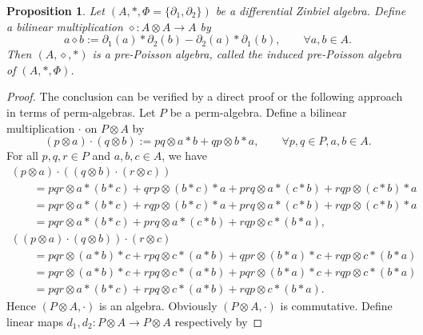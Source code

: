 \documentclass[10pt,a4paper]{amsart}
\numberwithin{equation}{section}
\newtheorem{Proposition}[Theorem]{Proposition}
{ \theoremstyle{definition}
	\newtheorem{Definition}[Theorem]{Definition}
	\newtheorem{Note}[Theorem]{Note}
	\newtheorem{Example}[Theorem]{Example}
	\newtheorem{Remark}[Theorem]{Remark} }
\begin{document}
\begin{Proposition}\label{pro:dzpp} Let $(A, \ast, \Phi = \{\partial_1, \partial_2\})$ be a differential Zinbiel algebra.
 Define a bilinear multiplication $\diamond\colon A \otimes A \to A$ by
 \begin{equation}
 a \diamond b := \partial_1(a) \ast \partial_2 (b) - \partial_2(a) \ast \partial_1(b), \qquad \forall a, b \in A. \label{eq:dzpp}
 \end{equation}
 Then $(A, \diamond, \ast)$ is a pre-Poisson algebra, called the \textit{induced pre-Poisson algebra of $(A, \ast, \Phi)$}.
\end{Proposition}
\begin{proof}The conclusion can be verified by a direct proof or the following approach in terms of perm-algebras. Let $P$ be a perm-algebra. Define a bilinear multiplication $\cdot$ on $P \otimes A$ by
 \begin{equation*}
 (p \otimes a) \cdot (q \otimes b) := pq \otimes a*b + qp \otimes b*a, \qquad \forall p, q \in P, a, b \in A.
 \end{equation*}
 For all $p, q, r \in P$ and $a, b, c \in A$, we have
 \begin{gather*}
 (p \otimes a) \cdot ((q \otimes b) \cdot (r \otimes c)) \\
 \qquad{}= pqr \otimes a \ast (b \ast c) + qrp \otimes (b \ast c) \ast a + prq \otimes a \ast (c \ast b) + rqp \otimes (c \ast b) \ast a \\
 \qquad{}=pqr \otimes a \ast (b \ast c) + rqp \otimes (b \ast c) \ast a + prq \otimes a \ast (c \ast b) + rqp \otimes (c \ast b) \ast a \\
\qquad{} = pqr \otimes a \ast (b \ast c) + prq \otimes a \ast (c \ast b) + rqp \otimes c \ast (b \ast a), \\
 ((p \otimes a) \cdot (q \otimes b)) \cdot (r \otimes c) \\
\qquad{} = pqr \otimes (a \ast b) \ast c + rpq \otimes c \ast (a \ast b) + qpr \otimes (b \ast a) \ast c + rqp \otimes c \ast (b \ast a) \\
\qquad{} = pqr \otimes (a \ast b) \ast c + rpq \otimes c \ast (a \ast b) + pqr \otimes (b \ast a) \ast c + rqp \otimes c \ast (b \ast a) \\
\qquad{} = pqr \otimes a \ast (b \ast c) + rpq \otimes c \ast (a \ast b) + rqp \otimes c \ast (b \ast a).
	\end{gather*}
 Hence $(P \otimes A, \cdot)$ is an algebra. Obviously $(P \otimes A, \cdot)$ is commutative.
 Define linear maps $d_1,d_2\colon P \otimes A \to P \otimes A$ respectively by

\end{proof}
\end{document}
